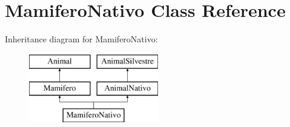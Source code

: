 \hypertarget{class_mamifero_nativo}{}\section{Mamifero\+Nativo Class Reference}
\label{class_mamifero_nativo}
Inheritance diagram for Mamifero\+Nativo\+:\begin{figure}[H]
\begin{center}
\leavevmode
\includegraphics[height=3.000000cm]{class_mamifero_nativo}
\end{center}
\end{figure}
